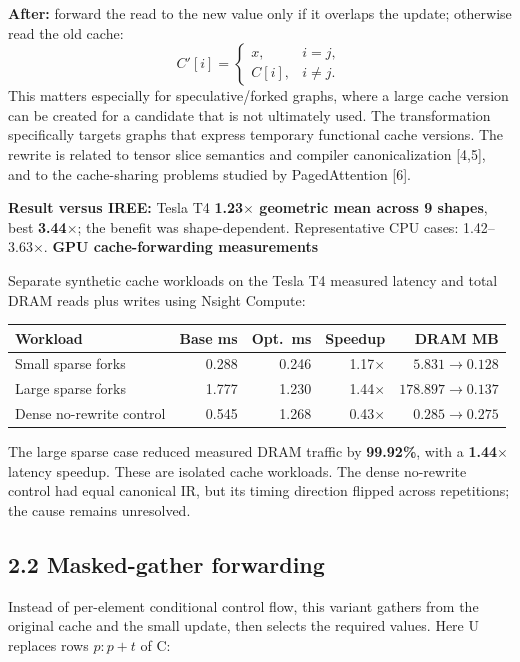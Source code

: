 \documentclass[10pt,a4paper]{article}
\newcommand{\smallhead}[1]{\vspace{5pt}\textbf{#1}\par}
\begin{document}
\textbf{After:} forward the read to the new value only if it overlaps the update; otherwise read the old cache:
\[
C'[i]=\begin{cases}x,&i=j,\\C[i],&i\ne j.\end{cases}
\]
This matters especially for speculative/forked graphs, where a large cache version can be created for a candidate that is not ultimately used. The transformation specifically targets graphs that express temporary functional cache versions. The rewrite is related to tensor slice semantics and compiler canonicalization [4,5], and to the cache-sharing problems studied by PagedAttention [6].

\textbf{Result versus IREE:} Tesla T4 \textbf{1.23$\times$ geometric mean across 9 shapes}, best \textbf{3.44$\times$}; the benefit was shape-dependent. Representative CPU cases: 1.42--3.63$\times$.
\smallhead{GPU cache-forwarding measurements}

Separate synthetic cache workloads on the Tesla T4 measured
latency and total DRAM reads plus writes using Nsight Compute:

\begin{center}
\small
\begin{tabular}{lrrrr}
\toprule
Workload & Base ms & Opt.\ ms & Speedup & DRAM MB \\
\midrule
Small sparse forks
& 0.288 & 0.246 & 1.17$\times$
& $5.831 \to 0.128$ \\
Large sparse forks
& 1.777 & 1.230 & 1.44$\times$
& $178.897 \to 0.137$ \\
Dense no-rewrite control
& 0.545 & 1.268 & 0.43$\times$
& $0.285 \to 0.275$ \\
\bottomrule
\end{tabular}
\end{center}

The large sparse case reduced measured DRAM traffic by
\textbf{99.92\%}, with a \textbf{1.44$\times$} latency speedup.
These are isolated cache workloads. The dense no-rewrite
control had equal canonical IR, but its timing direction
flipped across repetitions; the cause remains unresolved.

\subsection*{2.2 Masked-gather forwarding}

Instead of per-element conditional control flow, this variant
gathers from the original cache and the small update, then
selects the required values. Here U replaces rows $p:p+t$ of C:
\end{document}
